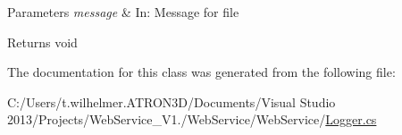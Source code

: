 \begin{DoxyParams}{Parameters}
{\em message} & In\+: Message for file \\
\hline
\end{DoxyParams}
\begin{DoxyReturn}{Returns}
void 
\end{DoxyReturn}


The documentation for this class was generated from the following file\+:\begin{DoxyCompactItemize}
\item 
C\+:/\+Users/t.\+wilhelmer.\+A\+T\+R\+O\+N3\+D/\+Documents/\+Visual Studio 2013/\+Projects/\+Web\+Service\+\_\+\+V1./\+Web\+Service/\+Web\+Service/\hyperlink{_logger_8cs}{Logger.\+cs}\end{DoxyCompactItemize}
